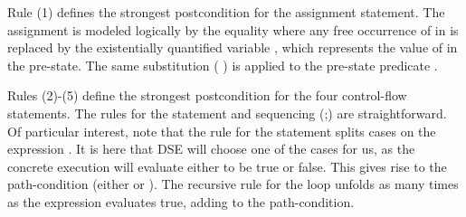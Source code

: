 ﻿\documentclass{IOS-Book-Article}
\begin{document}
\begin{mdP}[data-line={483}]%
{}Rule (1) defines the strongest postcondition for 
the assignment statement. The assignment is modeled
logically by the equality %
{}%
{} where any free occurrence of %
{}%
{} in %
{}%
{}
is replaced by the existentially quantified variable %
{}%
{}, which represents
the value of %
{}%
{} in the pre-state. The same substitution (%
{}\mdSpan[class={math-inline},elem={math-inline}]{$[x \rightarrow y ]$}%
{})
is applied to the pre-state predicate %
{}%
{}.%
\end{mdP}%
\begin{mdP}[class={indent},data-line={490}]%
{}Rules (2)-(5) define the strongest postcondition for the four control-flow
statements. The rules for the %
{}%
{} statement and sequencing (;) are
straightforward. 
Of particular interest, note that the rule for the %
{}%
{} 
statement splits cases on the expression %
{}%
{}. 
It is here that DSE will choose one of the cases for us, as the concrete
execution will evaluate %
{}%
{} either to be true or false. This gives rise
to the path-condition (either %
{}%
{} or %
{}%
{}). The
recursive rule for the %
{}%
{} loop unfolds as many times as the
expression %
{}%
{} evaluates true, adding to the path-condition.%
\end{mdP}%
\end{document}
